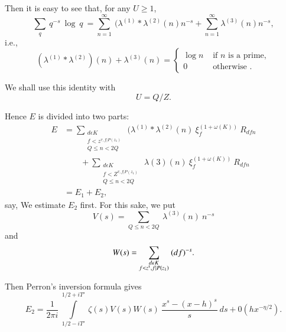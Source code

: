 Then it is easy to see that, for any $U \ge 1$,
$$
\sum_{q} ~ q^{-s} ~ \log ~ q ~ = \sum_{n=1}^{\infty} ~ (\lambda^{(1)}
* \lambda^{(2)}(n)n^{-s} + \sum_{n=1}^{\infty}\lambda^{(3)}(n)n^{-s}, 
$$
i.e.,
\begin{equation*}
(\lambda^{(1)} * \lambda^{(2)})(n) + \lambda^{(3)}(n) =
  \begin{cases}
    \log n &\text{ if $n$ is a prime},\\
    0  & \text{ otherwise }.
  \end{cases}
\end{equation*}

We shall use this identity with 
\begin{equation*}
  U = Q/Z. \tag{6.1.24}\label{eq6.1.24}
\end{equation*}

Hence $E$ is divided into two parts:
\begin{align*}
  E & = \sum_{\substack{d \epsilon  K \\ f < z^{\tau,  f|P(z_1)}
    \\ Q \leq n < 2Q}} ~(\lambda^{(1)} * \lambda^{(2)}(n)
  ~\xi^{(1+\omega(K))}_f ~ R_{dfn}\\
  & \qquad + \sum_{\substack{ d\epsilon  K \\ f < Z^{\tau, f | P(z_1)} \\ Q
    \leq n < 2Q}}~ \lambda{(3)}(n)~ \xi^{(1+\omega(K))}_f ~ R_{dfn}\\ 
  & = E_1 + E_2,
\end{align*}
say, We estimate $E_2$ first. For this sake, we put
$$
V(s) = \sum_{Q \leq n < 2Q } ~ \lambda^{(3)}(n)~n^{-s}
$$
and\pageoriginale
$$
W(s) = \sum_{\substack{d\epsilon  K \\ f < z^{\tauup}, f|P(z_1)}} ~
  (df)^{-s}.
$$

Then Perron's inversion formula gives
\begin{equation*}
E_2 = \frac{1}{2 \pi i} ~ \int\limits_{1/2-
  iT'}^{1/2+iT'}~\zeta(s)V(s)W(s) ~ \frac{x^s - (x-h)^s}{s} ~ ds +
0(hx^{-\eta/2}).\tag{6.1.25} \label{eq6.1.25}
\end{equation*}


